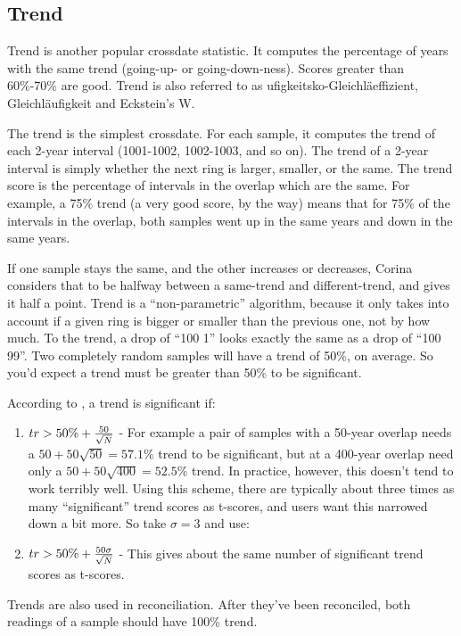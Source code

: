 \subsection{Trend}
Trend is another popular crossdate statistic.  It computes the percentage of years with the same trend (going-up- or going-down-ness). Scores greater than 60\%-70\% are good. Trend is also referred to as ufigkeitsko-Gleichläeffizient, Gleichläufigkeit and Eckstein's W.

The trend is the simplest crossdate. For each sample, it computes the trend of each 2-year interval (1001-1002, 1002-1003, and so on). The trend of a 2-year interval is simply whether the next ring is larger, smaller, or the same. The trend score is the percentage of intervals in the overlap which are the same. For example, a 75\% trend (a very good score, by the way) means that for 75\% of the intervals in the overlap, both samples went up in the same years and down in the same years.

If one sample stays the same, and the other increases or decreases, Corina considers that to be halfway between a same-trend and different-trend, and gives it half a point. Trend is a ``non-parametric'' algorithm, because it only takes into account if a given ring is bigger or smaller than the previous one, not by how much. To the trend, a drop of ``100 1'' looks exactly the same as a drop of ``100 99''. Two completely random samples will have a trend of 50\%, on average. So you'd expect a trend must be greater than 50\% to be significant.

According to \citet{Huber70}, a trend is significant if:

\begin{enumerate}
  \item \textbf{$tr > 50\% + {50 \over \sqrt{N}}$} - For example a pair of samples with a 50-year overlap needs a $50+50\sqrt{50} = 57.1\%$ trend to be significant, but at a 400-year overlap need only a $50 + 50\sqrt{400} = 52.5\%$ trend. In practice, however, this doesn't tend to work terribly well. Using this scheme, there are typically about three times as many ``significant'' trend scores as t-scores, and users want this narrowed down a bit more. So take $\sigma=3$ and use:
  \item $tr > 50\% + {50\sigma \over \sqrt{N}}$ - This gives about the same number of significant trend scores as t-scores. 

\end{enumerate}

Trends are also used in reconciliation. After they've been reconciled, both readings of a sample should have 100\% trend. 

